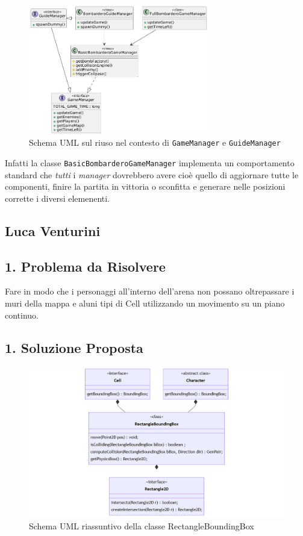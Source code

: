 \documentclass[a4paper,12pt]{report}
\begin{document}
\begin{figure}[H]
    \centering{}
    \includegraphics[width=0.7\textwidth]{img/managers.png}
    \caption{Schema UML sul riuso nel contesto di \texttt{GameManager} e \texttt{GuideManager}}
    \label{img:mapgenerator-gamemap}
\end{figure}

Infatti la classe \texttt{BasicBombarderoGameManager} implementa un comportamento standard che \textit{tutti} i \textit{manager} dovrebbero avere cioè quello di aggiornare tutte le componenti, finire la partita in vittoria o sconfitta e generare nelle posizioni corrette i diversi elemenenti. 

\subsection{Luca Venturini}
\subsection*{1. Problema da Risolvere}

\par
Fare in modo che i personaggi all'interno dell'arena non possano oltrepassare i muri della mappa e aluni tipi di Cell utilizzando un movimento su un piano continuo.
%
\subsection*{1. Soluzione Proposta}

\begin{figure}[H]
\centering{}
\includegraphics[width=\textwidth]{img/RectangleBoundingBox.png}
\caption{Schema UML riassuntivo della classe RectangleBoundingBox}
\end{figure}
\end{document}
